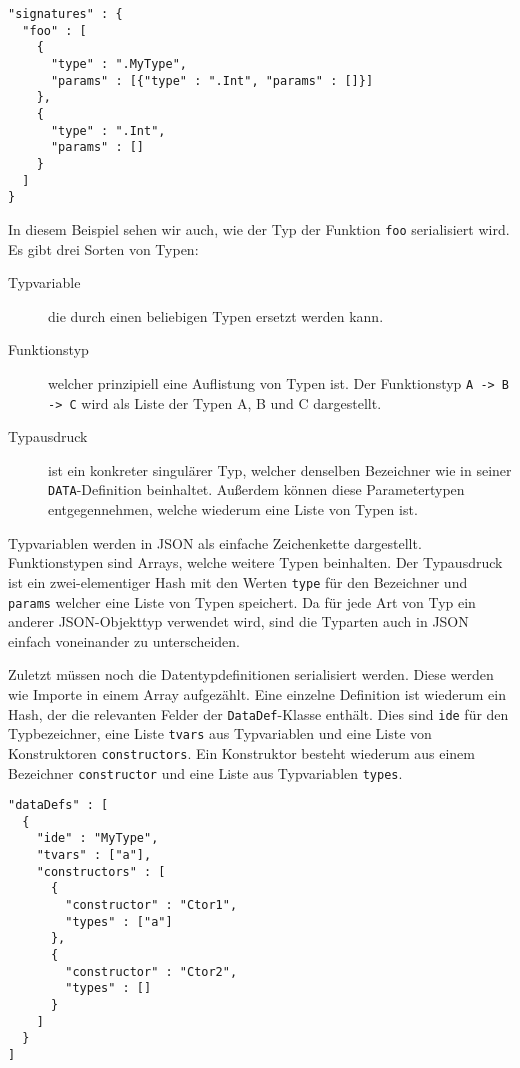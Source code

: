 \documentclass[runningheads]{llncs}
\begin{document}
\begin{verbatim}
"signatures" : {
  "foo" : [
    {
      "type" : ".MyType",
      "params" : [{"type" : ".Int", "params" : []}]
    },
    {
      "type" : ".Int",
      "params" : []
    }
  ]
}
\end{verbatim}

In diesem Beispiel sehen wir auch, wie der Typ der Funktion \verb|foo| serialisiert wird. Es gibt drei Sorten von Typen:

\begin{description}
 \item[Typvariable] die durch einen beliebigen Typen ersetzt werden kann.
 \item[Funktionstyp] welcher prinzipiell eine Auflistung von Typen ist. Der Funktionstyp \verb|A -> B -> C| wird als Liste der Typen A, B und C dargestellt.
 \item[Typausdruck] ist ein konkreter singulärer Typ, welcher denselben Bezeichner wie in seiner \verb|DATA|-Definition beinhaltet. Außerdem können diese Parametertypen entgegennehmen, welche wiederum eine Liste von Typen ist.
\end{description}

Typvariablen werden in JSON als einfache Zeichenkette dargestellt. Funktionstypen sind Arrays, welche weitere Typen beinhalten. Der Typausdruck ist ein zwei-elementiger Hash mit den Werten \verb|type| für den Bezeichner und \verb|params| welcher eine Liste von Typen speichert. Da für jede Art von Typ ein anderer JSON-Objekttyp verwendet wird, sind die Typarten auch in JSON einfach voneinander zu unterscheiden.

Zuletzt müssen noch die Datentypdefinitionen serialisiert werden. Diese werden wie Importe in einem Array aufgezählt. Eine einzelne Definition ist wiederum ein Hash, der die relevanten Felder der \verb|DataDef|-Klasse enthält. Dies sind \verb|ide| für den Typbezeichner, eine Liste \verb|tvars| aus Typvariablen und eine Liste von Konstruktoren \verb|constructors|. Ein Konstruktor besteht wiederum aus einem Bezeichner \verb|constructor| und eine Liste aus Typvariablen \verb|types|.

\begin{verbatim}
"dataDefs" : [
  {
    "ide" : "MyType",
    "tvars" : ["a"],
    "constructors" : [
      {
        "constructor" : "Ctor1",
        "types" : ["a"]
      },
      {
        "constructor" : "Ctor2",
        "types" : []
      }
    ]
  }
]
\end{verbatim}
\end{document}
